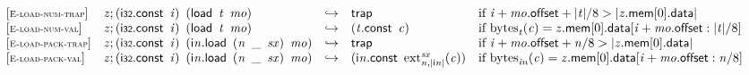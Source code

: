 $$
\begin{array}{@{}l@{}lcl@{}l@{}}
{[\textsc{\scriptsize E{-}load{-}num{-}trap}]} \quad & {\mathit{z}} ; (\mathsf{i{\scriptstyle32}}.\mathsf{const}~\,{\mathit{i}})~\,(\mathsf{load}~\,{\mathit{t}}~\,{\mathit{mo}}) &\hookrightarrow& \mathsf{trap} &\quad
  \mbox{if}~{\mathit{i}} + {\mathit{mo}}.\mathsf{offset} + {|{\mathit{t}}|} / 8 > {|{{\mathit{z}}.\mathsf{mem}}{{}[0]}.\mathsf{data}|} \\
{[\textsc{\scriptsize E{-}load{-}num{-}val}]} \quad & {\mathit{z}} ; (\mathsf{i{\scriptstyle32}}.\mathsf{const}~\,{\mathit{i}})~\,(\mathsf{load}~\,{\mathit{t}}~\,{\mathit{mo}}) &\hookrightarrow& ({\mathit{t}}.\mathsf{const}~\,{\mathit{c}}) &\quad
  \mbox{if}~{{\mathrm{bytes}}}_{{\mathit{t}}}({\mathit{c}}) = {{\mathit{z}}.\mathsf{mem}}{{}[0]}.\mathsf{data}{}[{\mathit{i}} + {\mathit{mo}}.\mathsf{offset} : {|{\mathit{t}}|} / 8] \\
{[\textsc{\scriptsize E{-}load{-}pack{-}trap}]} \quad & {\mathit{z}} ; (\mathsf{i{\scriptstyle32}}.\mathsf{const}~\,{\mathit{i}})~\,({\mathsf{i}}{{\mathit{n}}}.\mathsf{load}~\,({\mathit{n}}~\,\mathsf{\_}~\,{\mathit{sx}})~\,{\mathit{mo}}) &\hookrightarrow& \mathsf{trap} &\quad
  \mbox{if}~{\mathit{i}} + {\mathit{mo}}.\mathsf{offset} + {\mathit{n}} / 8 > {|{{\mathit{z}}.\mathsf{mem}}{{}[0]}.\mathsf{data}|} \\
{[\textsc{\scriptsize E{-}load{-}pack{-}val}]} \quad & {\mathit{z}} ; (\mathsf{i{\scriptstyle32}}.\mathsf{const}~\,{\mathit{i}})~\,({\mathsf{i}}{{\mathit{n}}}.\mathsf{load}~\,({\mathit{n}}~\,\mathsf{\_}~\,{\mathit{sx}})~\,{\mathit{mo}}) &\hookrightarrow& ({\mathsf{i}}{{\mathit{n}}}.\mathsf{const}~\,{{{{\mathrm{ext}}}_{{\mathit{n}}, {|{\mathsf{i}}{{\mathit{n}}}|}}^{{\mathit{sx}}}}}{({\mathit{c}})}) &\quad
  \mbox{if}~{{\mathrm{bytes}}}_{{{\mathit{i}}}{{\mathit{n}}}}({\mathit{c}}) = {{\mathit{z}}.\mathsf{mem}}{{}[0]}.\mathsf{data}{}[{\mathit{i}} + {\mathit{mo}}.\mathsf{offset} : {\mathit{n}} / 8] \\
\end{array}
$$

\vspace{1ex}

